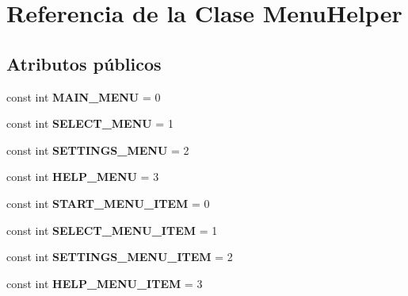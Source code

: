 \hypertarget{class_menu_helper}{}\section{Referencia de la Clase Menu\+Helper}
\label{class_menu_helper}
\subsection*{Atributos públicos}
\begin{DoxyCompactItemize}
\item 
\mbox{\label{class_menu_helper_a9604efdfe761d1688ef17148f7ca0ce6}} 
const int {\bfseries M\+A\+I\+N\+\_\+\+M\+E\+NU} = 0
\item 
\mbox{\label{class_menu_helper_acf425e6a3de500087e4587970a363142}} 
const int {\bfseries S\+E\+L\+E\+C\+T\+\_\+\+M\+E\+NU} = 1
\item 
\mbox{\label{class_menu_helper_af2c031eb53c011c96121e63cb0cd64d1}} 
const int {\bfseries S\+E\+T\+T\+I\+N\+G\+S\+\_\+\+M\+E\+NU} = 2
\item 
\mbox{\label{class_menu_helper_a047cc31e9af051571b271fd64144684f}} 
const int {\bfseries H\+E\+L\+P\+\_\+\+M\+E\+NU} = 3
\item 
\mbox{\label{class_menu_helper_a9e3ccf211efce4959114f11f022d6962}} 
const int {\bfseries S\+T\+A\+R\+T\+\_\+\+M\+E\+N\+U\+\_\+\+I\+T\+EM} = 0
\item 
\mbox{\label{class_menu_helper_a6b8375dd4e3052220c59c3321f844629}} 
const int {\bfseries S\+E\+L\+E\+C\+T\+\_\+\+M\+E\+N\+U\+\_\+\+I\+T\+EM} = 1
\item 
\mbox{\label{class_menu_helper_adc1017302f3a549acbda6011e76a0a79}} 
const int {\bfseries S\+E\+T\+T\+I\+N\+G\+S\+\_\+\+M\+E\+N\+U\+\_\+\+I\+T\+EM} = 2
\item 
\mbox{\label{class_menu_helper_a718d1c65b7646d0eaeacda970e729750}} 
const int {\bfseries H\+E\+L\+P\+\_\+\+M\+E\+N\+U\+\_\+\+I\+T\+EM} = 3
\item 
\mbox{\label{class_menu_helper_a412b06bbbb164e8b8dc77703067ff815}} 

\end{DoxyCompactItemize}
